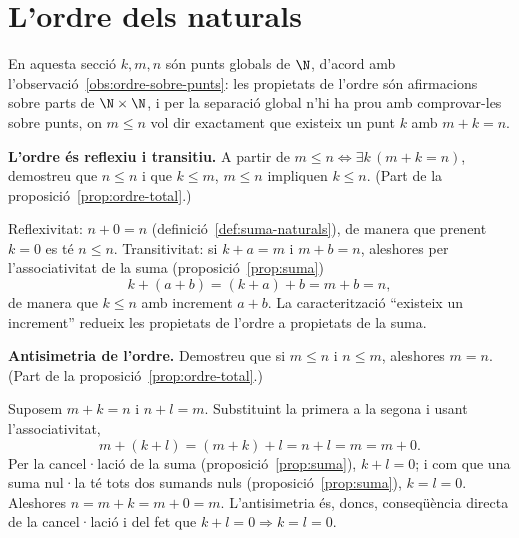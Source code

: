 \section{L'ordre dels naturals}\label{prac:ordre}

En aquesta secció \(k,m,n\) són punts globals de \(\N\), d'acord amb l'observació~\ref{obs:ordre-sobre-punts}: les propietats de l'ordre són afirmacions sobre parts de \(\N\times\N\), i per la separació global n'hi ha prou amb comprovar-les sobre punts, on \(m\le n\) vol dir exactament que existeix un punt \(k\) amb \(m+k=n\).

\begin{exercici}
\textbf{L'ordre és reflexiu i transitiu.} A partir de \(m\le n\iff\exists k\,(m+k=n)\), demostreu que \(n\le n\) i que \(k\le m\), \(m\le n\) impliquen \(k\le n\). (Part de la proposició~\ref{prop:ordre-total}.)
\end{exercici}
\begin{solucio}
Reflexivitat: \(n+0=n\) (definició~\ref{def:suma-naturals}), de manera que prenent \(k=0\) es té \(n\le n\). Transitivitat: si \(k+a=m\) i \(m+b=n\), aleshores per l'associativitat de la suma (proposició~\ref{prop:suma})
\[
k+(a+b)=(k+a)+b=m+b=n,
\]
de manera que \(k\le n\) amb increment \(a+b\). La caracterització \enquote{existeix un increment} redueix les propietats de l'ordre a propietats de la suma.
\end{solucio}

\begin{exercici}
\textbf{Antisimetria de l'ordre.} Demostreu que si \(m\le n\) i \(n\le m\), aleshores \(m=n\). (Part de la proposició~\ref{prop:ordre-total}.)
\end{exercici}
\begin{solucio}
Suposem \(m+k=n\) i \(n+l=m\). Substituint la primera a la segona i usant l'associativitat,
\[
m+(k+l)=(m+k)+l=n+l=m=m+0.
\]
Per la cancel·lació de la suma (proposició~\ref{prop:suma}), \(k+l=0\); i com que una suma nul·la té tots dos sumands nuls (proposició~\ref{prop:suma}), \(k=l=0\). Aleshores \(n=m+k=m+0=m\). L'antisimetria és, doncs, conseqüència directa de la cancel·lació i del fet que \(k+l=0\Rightarrow k=l=0\).
\end{solucio}

